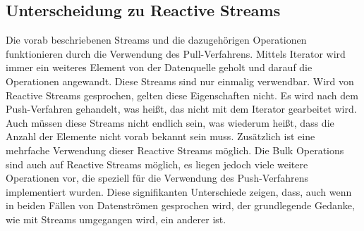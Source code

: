 \subsection{Unterscheidung zu Reactive Streams}
Die vorab beschriebenen Streams und die dazugehörigen Operationen funktionieren durch die Verwendung des Pull-Verfahrens. Mittels Iterator wird immer ein weiteres Element von der Datenquelle geholt und darauf die Operationen angewandt. Diese Streams sind nur einmalig verwendbar. Wird von Reactive Streams gesprochen, gelten diese Eigenschaften nicht. Es wird nach dem Push-Verfahren gehandelt, was heißt, das nicht mit dem Iterator gearbeitet wird. Auch müssen diese Streams nicht endlich sein, was wiederum heißt, dass die Anzahl der Elemente nicht vorab bekannt sein muss. Zusätzlich ist eine mehrfache Verwendung dieser Reactive Streams möglich. Die Bulk Operations sind auch auf Reactive Streams möglich, es liegen jedoch viele weitere Operationen vor, die speziell für die Verwendung des Push-Verfahrens implementiert wurden. Diese signifikanten Unterschiede zeigen, dass, auch wenn in beiden Fällen von Datenströmen gesprochen wird, der grundlegende Gedanke, wie mit Streams umgegangen wird, ein anderer ist.

